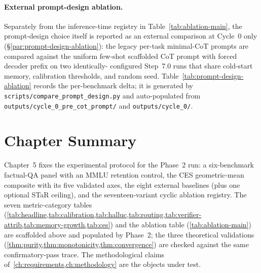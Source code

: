 \paragraph{External prompt-design ablation.}
Separately from the inference-time registry in
Table~\ref{tab:ablation-main}, the prompt-design choice itself is
reported as an external comparison at Cycle~0 only
(\S\ref{par:prompt-design-ablation}): the legacy per-task
minimal-CoT prompts are compared against the uniform few-shot
scaffolded CoT prompt with forced decoder prefix on two identically-
configured Step~7.0 runs that share cold-start memory, calibration
thresholds, and random seed. Table~\ref{tab:prompt-design-ablation}
records the per-benchmark delta; it is generated by
\texttt{scripts/compare\_prompt\_design.py} and auto-populated from
\texttt{outputs/cycle\_0\_pre\_cot\_prompt/} and
\texttt{outputs/cycle\_0/}.



\section{Chapter Summary}
\label{sec:ch5-summary}

Chapter~5 fixes the experimental protocol for the Phase~2 run: a
six-benchmark factual-QA panel with an MMLU retention control, the
CES geometric-mean composite with its five validated axes, the eight
external baselines (plus one optional STaR ceiling), and the
seventeen-variant cyclic ablation registry. The seven metric-category
tables (\cref{tab:headline,tab:calibration,tab:halluc,tab:routing,tab:verifier-attrib,tab:memory-growth,tab:ces})
and the ablation table (\cref{tab:ablation-main}) are scaffolded
above and populated by Phase~2; the three theoretical validations
(\cref{thm:purity,thm:monotonicity,thm:convergence}) are checked
against the same confirmatory-pass trace. The methodological claims
of~\cref{ch:requirements,ch:methodology} are the objects under test.
